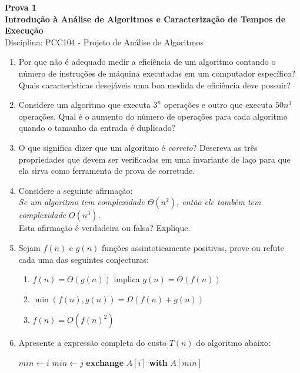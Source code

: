 \documentclass[9pt,a4paper]{extarticle}
\begin{document}
\begin{center}
  \Large \textbf{Prova 1 \\ Introdução à Análise de Algoritmos e Caracterização de Tempos de Execução} \\[4pt]
  \normalsize Disciplina: PCC104 - Projeto de Análise de Algoritmos
\end{center}

\vspace{1cm}

\begin{enumerate}
  \item Por que não é adequado medir a eficiência de um algoritmo contando o número de instruções de máquina executadas em um computador específico? Quais características desejáveis uma boa medida de eficiência deve possuir?

  \item Considere um algoritmo que executa $3^n$ operações e outro que executa $50n^3$ operações. Qual é o aumento do número de operações para cada algoritmo quando o tamanho da entrada é duplicado?

  \item O que significa dizer que um algoritmo é \textit{correto}? Descreva as três propriedades que devem ser verificadas em uma invariante de laço para que ela sirva como ferramenta de prova de corretude.

  \item Considere a seguinte afirmação: \\
  \textit{Se um algoritmo tem complexidade $\Theta(n^2)$, então ele também tem complexidade $O(n^3)$.}\\
  Esta afirmação é verdadeira ou falsa? Explique.

  \item Sejam $f(n)$ e $g(n)$ funções assintoticamente positivas, prove ou refute cada uma das seguintes conjecturas:
  \begin{enumerate}
    \item $f(n) = \Theta(g(n))$ implica $g(n) = \Theta(f(n))$
    \item $\min(f(n), g(n)) = \Omega(f(n) + g(n))$  
    \item $f(n) = O(f(n)^2)$
  \end{enumerate}

  \item Apresente a expressão completa do custo $T(n)$ do algoritmo abaixo:
    \begin{algorithmic}[1]
        \State $min \gets i$
                \State $min \gets j$
            \EndIf
        \EndFor
        \State \textbf{exchange} $A[i]$ \textbf{with} $A[min]$
    \EndFor
  \end{algorithmic}


\end{enumerate}
\end{document}
